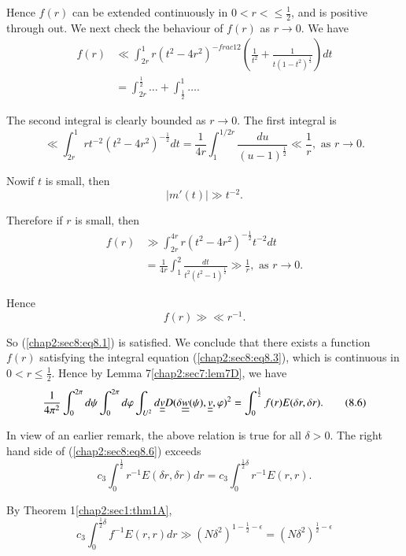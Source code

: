 Hence $f(r)$ can be extended continuously in $0 < r < \leq \frac{1}{2}$, and is positive through out. We next check the behaviour of $f(r)$ as $r \to 0$. We have
\begin{align*}
 f(r) &\ll \int_{2r}^{1} r(t^{2} - 4r^{2})^{-frac{1}{2}} \left(\frac{1}{t^{2}} + \frac{1}{t(1 - t^{2})^{\frac{1}{2}}}\right)dt\\
& = \int_{2r}^{\frac{1}{2}} \ldots + \int_{\frac{1}{2}}^{1} \ldots .
\end{align*}

The second integral is clearly bounded as $r \to 0$. The first integral is
\begin{equation*}
\ll \int_{2r}^{1} rt^{-2} (t^{2} - 4r^{2})^{-\frac{1}{2}} dt = \frac{1}{4r} \int_{1}^{1/2r} \frac{du}{(u - 1)^{\frac{1}{2}}} \ll \frac{1}{r}, \text{ as } r \to 0.
\end{equation*}

Now\pageoriginale if $t$ is small, then
$$
|m'(t)| \gg t^{-2}.
$$

Therefore if $r$ is small, then
\begin{align*}
f(r) & \gg \int_{2r}^{4r} r(t^{2} - 4r^{2})^{-\frac{1}{2}} t^{-2} dt\\
& = \frac{1}{4r} \int_{1}^{2} \frac{dt}{t^{2}(t^{2}-1)^{\frac{1}{2}}} \gg \frac{1}{r}, \text{ as } r \to 0.
\end{align*}

Hence
$$
f(r) \gg \ll r^{-1}.
$$

So (\ref{chap2:sec8:eq8.1}) is satisfied. We conclude that there exists a function $f(r)$ satisfying the integral equation (\ref{chap2:sec8:eq8.3}), which is continuous in $0 < r \leq \frac{1}{2}$. Hence by Lemma 7\ref{chap2:sec7:lem7D}, we have
\begin{equation*}
\frac{1}{4\pi^{2}} \int_{0}^{2\pi} d\psi \int_{0}^{2\pi} d\varphi \int_{U^{2}} d\underline{\underline{v}} D(\delta \underline{\underline{w}} (\psi), \underline{\underline{v}}, \varphi)^{2} = \int_{0}^{\frac{1}{2}} f(r) E(\delta r, \delta r).\tag{8.6}\label{chap2:sec8:eq8.6}
\end{equation*}

In view of an earlier remark, the above relation is true for all $\delta > 0$. The right hand side of (\ref{chap2:sec8:eq8.6}) exceeds
\begin{equation*}
c_{3} \int_{0}^{\frac{1}{2}} r^{-1} E(\delta r, \delta r) dr = c_{3} \int_{0}^{\frac{1}{2} \delta} r^{-1} E(r, r).\tag{8.7}\label{chap2:sec8:eq8.7}
\end{equation*}

By Theorem 1\ref{chap2:sec1:thm1A},
\begin{equation*}
c_{3} \int_{0}^{\frac{1}{2} \delta} f^{-1} E(r, r) dr \gg (N \delta^{2})^{1-\frac{1}{2}-\epsilon} = (N \delta^{2})^{\frac{1}{2}-\epsilon}\tag{8.8}\label{chap2:sec8:eq8.8}
\end{equation*}

